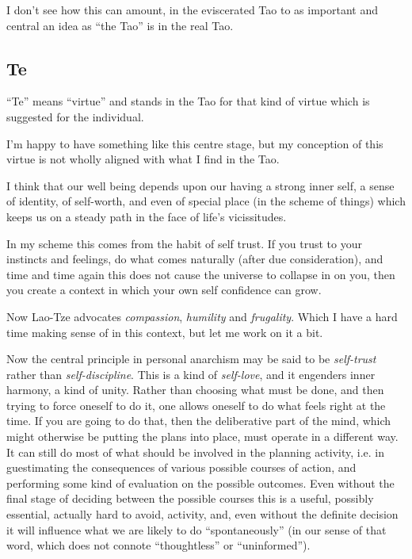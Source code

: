 \documentclass[numreferences]{rbjk}
\begin{document}
\begin{article}
I don't see how this can amount, in the eviscerated Tao to as important and central an idea as ``the Tao'' is in the real Tao.

\subsection{Te}

``Te'' means ``virtue'' and stands in the Tao for that kind of virtue which is suggested for the individual.

I'm happy to have something like this centre stage, but my conception of this virtue is not wholly aligned with what I find in the Tao.

I think that our well being depends upon our having a strong inner self, a sense of identity, of self-worth, and even of special place (in the scheme of things) which keeps us on a steady path in the  face of life's vicissitudes.

In my scheme this comes from the habit of self trust.
If you trust to your instincts and feelings, do what comes naturally (after due consideration), and time and time again this does not cause the universe to collapse in on you, then you create a context in which your own self confidence can grow.

Now Lao-Tze advocates {\it compassion}, {\it humility} and {\it frugality}.
Which I have a hard time making sense of in this context, but let me work on it a bit.

Now the central principle in personal anarchism may be said to be {\it self-trust} rather than {\it self-discipline}.
This is a kind of {\it self-love}, and it engenders inner harmony, a kind of unity.
Rather than choosing what must be done, and then trying to force oneself to do it, one allows oneself to do what feels right at the time.
If you are going to do that, then the deliberative part of the mind, which might otherwise be putting the plans into place, must operate in a different way.
It can still do most of what should be involved in the planning activity, i.e. in guestimating the consequences of various possible courses of action, and performing some kind of evaluation on the possible outcomes.
Even without the final stage of deciding between the possible courses this is a useful, possibly essential, actually hard to avoid, activity, and, even without the definite decision it will influence what we are likely to do ``spontaneously'' (in our sense of that word, which does not connote ``thoughtless'' or ``uninformed'').


\end{article}
\end{document}
